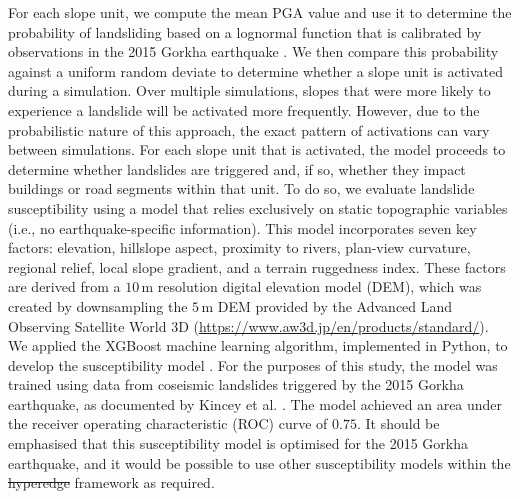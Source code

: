 \documentclass[preprint,12pt,authoryear]{elsarticle}
\makeatletter
\providecommand{\DIFaddtex}[1]{{\protect\color{blue}\uwave{#1}}} %
\providecommand{\DIFdeltex}[1]{{\protect\color{red}\sout{#1}}} %
\providecommand{\DIFaddbegin}{} %
\providecommand{\DIFaddend}{} %
\providecommand{\DIFdelbegin}{} %
\providecommand{\DIFdelend}{} %
\providecommand{\DIFadd}[1]{\texorpdfstring{\DIFaddtex{#1}}{#1}} %
\providecommand{\DIFdel}[1]{\texorpdfstring{\DIFdeltex{#1}}{}} %
\providecommand{\DIFscaledelfig}{0.5}
\newlength{\DIFdelgraphicswidth} %
\newlength{\DIFdelgraphicsheight} %
\providecommand{\DIFaddincludegraphics}[2][]{{\color{blue}\fbox{\DIFOincludegraphics[#1]{#2}}}} %
\providecommand{\DIFdelincludegraphics}[2][]{%
\sbox{\DIFdelgraphicsbox}{\DIFOincludegraphics[#1]{#2}}%
\settoboxwidth{\DIFdelgraphicswidth}{\DIFdelgraphicsbox} %
\settoboxtotalheight{\DIFdelgraphicsheight}{\DIFdelgraphicsbox} %
\scalebox{\DIFscaledelfig}{%
\parbox[b]{\DIFdelgraphicswidth}{\usebox{\DIFdelgraphicsbox}\\[-\baselineskip] \rule{\DIFdelgraphicswidth}{0em}}\llap{\resizebox{\DIFdelgraphicswidth}{\DIFdelgraphicsheight}{%
\setlength{\unitlength}{\DIFdelgraphicswidth}%
\begin{picture}(1,1)%
\thicklines\linethickness{2pt} %
{\color[rgb]{1,0,0}\put(0,0){\framebox(1,1){}}}%
{\color[rgb]{1,0,0}\put(0,0){\line( 1,1){1}}}%
{\color[rgb]{1,0,0}\put(0,1){\line(1,-1){1}}}%
\end{picture}%
}\hspace*{3pt}}} %
} %
\DeclareRobustCommand{\DIFaddbegin}{\DIFOaddbegin \let\includegraphics\DIFaddincludegraphics} %
\DeclareRobustCommand{\DIFaddend}{\DIFOaddend \let\includegraphics\DIFOincludegraphics} %
\DeclareRobustCommand{\DIFdelbegin}{\DIFOdelbegin \let\includegraphics\DIFdelincludegraphics} %
\DeclareRobustCommand{\DIFdelend}{\DIFOaddend \let\includegraphics\DIFOincludegraphics} %
\let\sout@orig\sout %
\renewcommand{\sout}[1]{\ifmmode\text{\sout@orig{\ensuremath{#1}}}\else\sout@orig{#1}\fi} %
\makeatother
\begin{document}
For each slope unit, we compute the mean PGA value and use it to determine the probability of landsliding based on a lognormal function that is calibrated by observations in the 2015 Gorkha earthquake \citep{Dunant2025}. We then compare this probability against a uniform random deviate to determine whether a slope unit is activated during a simulation. Over multiple simulations, slopes that were more likely to experience a landslide will be activated more frequently. However, due to the probabilistic nature of this approach, the exact pattern of activations can vary between simulations. For each slope unit that is activated, the model proceeds to determine whether landslides are triggered and, if so, whether they impact buildings or road segments within that unit. To do so, we evaluate landslide susceptibility using a model that relies exclusively on static topographic variables (i.e., no earthquake-specific information). This model incorporates seven key factors: elevation, hillslope aspect, proximity to rivers, plan-view curvature, regional relief, local slope gradient, and a terrain ruggedness index. These factors are derived from a $10\,\text{m}$ resolution digital elevation model (DEM), which was created by downsampling the $5\,\text{m}$ DEM provided by the Advanced Land Observing Satellite World 3D (\url{https://www.aw3d.jp/en/products/standard/}). We applied the XGBoost machine learning algorithm, implemented in Python, to develop the susceptibility model \citep{Dunant2025}. For the purposes of this study, the model was trained using data from coseismic landslides triggered by the 2015 Gorkha earthquake, as documented by Kincey et al. \citep{Kincey2021}. The model achieved an area under the receiver operating characteristic (ROC) curve of $0.75$. It should be emphasised that this susceptibility model is optimised for the 2015 Gorkha earthquake, and it would be possible to use other susceptibility models within the \DIFdelbegin \DIFdel{hyperedge }\DIFdelend \DIFaddbegin \DIFadd{hypergraph }\DIFaddend framework as required.
\end{document}
